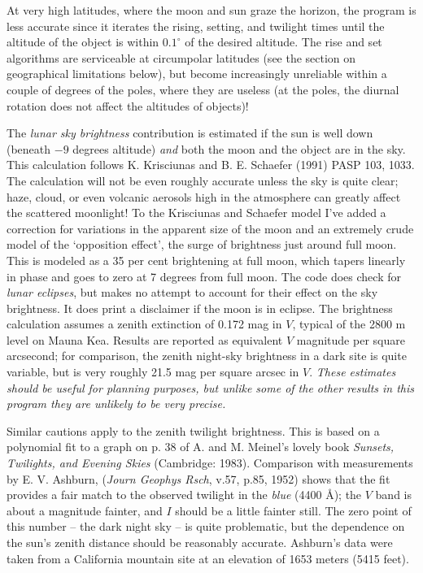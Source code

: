 At very high latitudes, where the moon and sun graze the horizon, the 
program is less accurate since it iterates the rising, setting, and twilight 
times until the altitude of the object is within $0.1^{\circ}$ of the 
desired altitude. The rise and set algorithms are serviceable at circumpolar 
latitudes (see the section on geographical limitations below), but become
increasingly unreliable within a couple of degrees of the poles, where they 
are useless (at the poles, the diurnal rotation does not affect the altitudes 
of objects)!

The {\it lunar sky brightness} contribution is estimated if the sun is well 
down (beneath $-9$ degrees altitude) {\it and} both the moon and the object 
are in the sky.  This calculation follows K. Krisciunas and B. E. Schaefer 
(1991) PASP 103, 1033.  The calculation will not be even roughly accurate 
unless the sky is quite clear; haze, cloud, or even volcanic aerosols high
in the atmosphere can greatly affect the scattered moonlight!  To the 
Krisciunas and Schaefer model I've added a correction for variations in the 
apparent size of the moon and an extremely crude model of the `opposition 
effect', the surge of brightness just around full moon. This is modeled as a 
35 per cent brightening at full moon, which tapers linearly in phase and 
goes to zero at 7 degrees from full moon.  The code does check for 
{\it lunar eclipses}, but makes no attempt to account for their effect on 
the sky brightness.  It does print a disclaimer if the moon is in eclipse.
The brightness calculation assumes a zenith extinction of 0.172 mag in $V$,
typical of the 2800 m level on Mauna Kea.  Results are reported
as equivalent $V$ magnitude per square arcsecond; for comparison, 
the zenith night-sky brightness in a dark site is quite variable, but
is very roughly 21.5 mag per square arcsec in $V$.  
{\it These estimates should be useful for planning purposes, but unlike some 
of the other results in this program they are unlikely to be very precise.}

Similar cautions apply to the zenith twilight brightness.  This is
based on a polynomial fit to a graph on p. 38 of A. and M. Meinel's lovely 
book {\it Sunsets, Twilights, and Evening Skies} (Cambridge: 1983).  
Comparison with measurements by E. V. Ashburn, ({\it Journ Geophys
Rsch}, v.57, p.85, 1952) shows that the fit provides a fair match
to the observed twilight in the {\it blue} (4400 \AA ); the $V$
band is about a magnitude fainter, and $I$ should be a little fainter
still.  The zero point of this number -- the dark night sky -- is 
quite problematic, but the dependence on the sun's zenith distance 
should be reasonably accurate.  Ashburn's data were taken from a 
California mountain site at an elevation of 1653 meters (5415 feet).  
 
